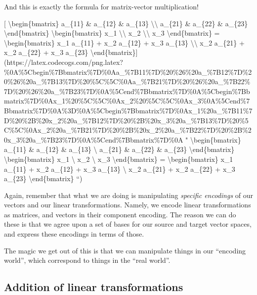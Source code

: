 \documentclass[]{article}
\begin{document}
And this is exactly the formula for matrix-vector multiplication!

{[} \textbackslash{}begin\{bmatrix\} a\_\{11\} \& a\_\{12\} \& a\_\{13\}
\textbackslash{}\textbackslash{} a\_\{21\} \& a\_\{22\} \& a\_\{23\}
\textbackslash{}end\{bmatrix\} \textbackslash{}begin\{bmatrix\} x\_1
\textbackslash{}\textbackslash{} x\_2 \textbackslash{}\textbackslash{} x\_3
\textbackslash{}end\{bmatrix\} = \textbackslash{}begin\{bmatrix\} x\_1 a\_\{11\}
+ x\_2 a\_\{12\} + x\_3 a\_\{13\} \textbackslash{}\textbackslash{} x\_2
a\_\{21\} + x\_2 a\_\{22\} + x\_3 a\_\{23\}
\textbackslash{}end\{bmatrix\}{]}(https://latex.codecogs.com/png.latex?\%0A\%5Cbegin\%7Bbmatrix\%7D\%0Aa\_\%7B11\%7D\%20\%26\%20a\_\%7B12\%7D\%20\%26\%20a\_\%7B13\%7D\%20\%5C\%5C\%0Aa\_\%7B21\%7D\%20\%26\%20a\_\%7B22\%7D\%20\%26\%20a\_\%7B23\%7D\%0A\%5Cend\%7Bbmatrix\%7D\%0A\%5Cbegin\%7Bbmatrix\%7D\%0Ax\_1\%20\%5C\%5C\%0Ax\_2\%20\%5C\%5C\%0Ax\_3\%0A\%5Cend\%7Bbmatrix\%7D\%0A\%3D\%0A\%5Cbegin\%7Bbmatrix\%7D\%0Ax\_1\%20a\_\%7B11\%7D\%20\%2B\%20x\_2\%20a\_\%7B12\%7D\%20\%2B\%20x\_3\%20a\_\%7B13\%7D\%20\%5C\%5C\%0Ax\_2\%20a\_\%7B21\%7D\%20\%2B\%20x\_2\%20a\_\%7B22\%7D\%20\%2B\%20x\_3\%20a\_\%7B23\%7D\%0A\%5Cend\%7Bbmatrix\%7D\%0A
" \textbackslash{}begin\{bmatrix\} a\_\{11\} \& a\_\{12\} \& a\_\{13\}
\textbackslash{} a\_\{21\} \& a\_\{22\} \& a\_\{23\}
\textbackslash{}end\{bmatrix\} \textbackslash{}begin\{bmatrix\} x\_1
\textbackslash{} x\_2 \textbackslash{} x\_3 \textbackslash{}end\{bmatrix\} =
\textbackslash{}begin\{bmatrix\} x\_1 a\_\{11\} + x\_2 a\_\{12\} + x\_3
a\_\{13\} \textbackslash{} x\_2 a\_\{21\} + x\_2 a\_\{22\} + x\_3 a\_\{23\}
\textbackslash{}end\{bmatrix\} ``)

Again, remember that what we are doing is manipulating \emph{specific encodings}
of our vectors and our linear transformations. Namely, we encode linear
transformations as matrices, and vectors in their component encoding. The reason
we can do these is that we agree upon a set of bases for our source and target
vector spaces, and express these encodings in terms of those.

The magic we get out of this is that we can manipulate things in our ``encoding
world'', which correspond to things in the ``real world''.

\hypertarget{addition-of-linear-transformations}{%
\subsection{Addition of linear
transformations}\label{addition-of-linear-transformations}}
\end{document}
